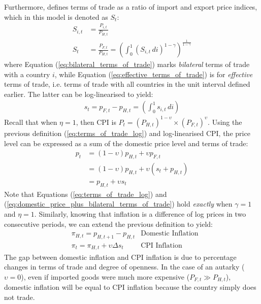 Furthermore, \textcite{oecd_2022_international} defines terms of trade as a ratio of import and export price indices, which in this model is denoted as $S_t$:
\begin{align}
 S_{i,t} &= \frac{P_{i,t}}{P_{H,t}} \label{eq:bilateral_terms_of_trade} \\
 S_{t} &= \frac{P_{F,t}}{P_{H,t}} = \left(\int_{0}^{1} (S_{i,t} \, di)^{1-\gamma}\right)^{\frac{1}{1-\gamma}} \label{eq:effective_terms_of_trade} 
\end{align}
where Equation (\ref{eq:bilateral_terms_of_trade}) marks \textit{bilateral} terms of trade with a country $i$, while Equation (\ref{eq:effective_terms_of_trade}) is for \textit{effective} terms of trade, i.e. terms of trade with all countries in the unit interval defined earlier. The latter can be log-linearised to yield:
\begin{align}
 s_t = p_{F,t} - p_{H,t} = \left(\int_{0}^{1} s_{i,t} \, di \right) \label{eq:terms_of_trade_log} 
\end{align}
Recall that when $\eta = 1$, then CPI is $P_t = (P_{H,t})^{1-\upsilon} \times (P_{F,t})^{\upsilon}$. Using the previous definition (\ref{eq:terms_of_trade_log}) and log-linearised CPI, the price level can be expressed as a sum of the domestic price level and terms of trade:
\begin{align}
 p_t &= (1-\upsilon)p_{H,t} + \upsilon p_{F,t} \\
 &= (1-\upsilon)p_{H,t} + \upsilon (s_t + p_{H,t}) \\
 &= p_{H,t} + \upsilon s_t \label{eq:domestic_price_plus_bilateral_terms_of_trade}
\end{align}
Note that Equations (\ref{eq:terms_of_trade_log}) and (\ref{eq:domestic_price_plus_bilateral_terms_of_trade}) hold \textit{exactly} when $\gamma=1$ and $\eta = 1$. Similarly, knowing that inflation is a difference of log prices in two consecutive periods, we can extend the previous definition to yield:
\begin{align}
 &\pi_{H,t} = p_{H,t+1} - p_{H,t} & \text{Domestic Inflation} \\
 &\pi_{t} = \pi_{H,t} + \upsilon \Delta s_t \label{eq:cpi_inflation_tot}& \text{CPI Inflation}
\end{align}
The gap between domestic inflation and CPI inflation is due to percentage changes in terms of trade and degree of openness. In the case of an autarky ($\upsilon = 0$), even if imported goods were much more expensive ($P_{F,t} \gg P_{H,t}$), domestic inflation will be equal to CPI inflation because the country simply does not trade.

